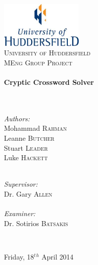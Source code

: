 \begin{titlepage}
  \begin{center}

  \includegraphics[width=0.3\textwidth]{./UoHLogo.jpg}~\\[2.5cm]

  \textsc{\LARGE University of Huddersfield}\\[1.5cm]

  \textsc{\Large MEng Group Project}\\[0.75cm]

  \HRule \\[0.4cm]
    { \huge \bfseries Cryptic Crossword Solver }
  \\[0.1cm]

  \HRule \\[2cm]

  \begin{minipage}{0.4\textwidth}
    \begin{flushleft} \large ~\\
      \emph{Authors:}\\
      Mohammad \textsc{Rahman} \\
      Leanne \textsc{Butcher} \\
      Stuart \textsc{Leader} \\
      Luke \textsc{Hackett} 
    \end{flushleft}
  \end{minipage}
  \begin{minipage}{0.4\textwidth}
    \begin{flushright} \large ~\\
      \emph{Supervisor:} \\ 
      Dr. Gary \textsc{Allen}
      ~\\ ~\\
      \emph{Examiner:} \\
      Dr. Sotirios \textsc{Batsakis} 
    \end{flushright}
  \end{minipage}

  ~\\[0.01cm]


  \vfill

  {\large Friday, 18$^t$$^h$ April 2014}

  \end{center}
\end{titlepage}
